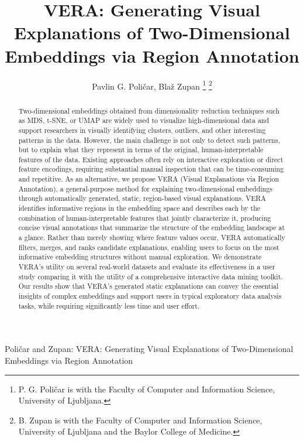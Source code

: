 \documentclass[lettersize,journal]{IEEEtran}
\begin{document}
\title{VERA: Generating Visual Explanations of Two-Dimensional Embeddings via Region Annotation}

\author{Pavlin G. Poli\v{c}ar, Bla\v{z} Zupan
\thanks{P. G. Poli\v{c}ar is with the Faculty of Computer and Information Science, University of Ljubljana.}%
\thanks{B. Zupan is with the Faculty of Computer and Information Science, University of Ljubljana and the Baylor College of Medicine.}}

\markboth{}%
{Poli\v{c}ar and Zupan: VERA: Generating Visual Explanations of Two-Dimensional Embeddings via Region Annotation}

\IEEEpubid{}

\maketitle

\begin{abstract}
Two-dimensional embeddings obtained from dimensionality reduction techniques such as MDS, t-SNE, or UMAP are widely used to visualize high-dimensional data and support researchers in visually identifying clusters, outliers, and other interesting patterns in the data. However, the main challenge is not only to detect such patterns, but to explain what they represent in terms of the original, human-interpretable features of the data. Existing approaches often rely on interactive exploration or direct feature encodings, requiring substantial manual inspection that can be time-consuming and repetitive.
As an alternative, we propose VERA (Visual Explanations via Region Annotation), a general-purpose method for explaining two-dimensional embeddings through automatically generated, static, region-based visual explanations.
VERA identifies informative regions in the embedding space and describes each by the combination of human-interpretable features that jointly characterize it, producing concise visual annotations that summarize the structure of the embedding landscape at a glance. Rather than merely showing where feature values occur, VERA automatically filters, merges, and ranks candidate explanations, enabling users to focus on the most informative embedding structures without manual exploration.
We demonstrate VERA's utility on several real-world datasets and evaluate its effectiveness in a user study comparing it with the utility of a comprehensive interactive data mining toolkit.
Our results show that VERA's generated static explanations can convey the essential insights of complex embeddings and support users in typical exploratory data analysis tasks, while requiring significantly less time and user effort.
\end{abstract}
\end{document}
